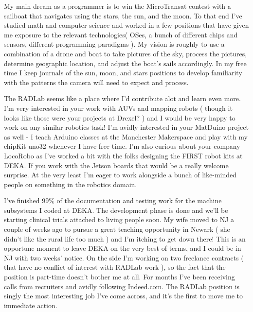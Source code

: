 \documentclass[11pt, a4paper]{awesome-cv}
\begin{document}
\makecvheader

\makelettertitle

\begin{cvletter}
My main dream as a programmer is to win the MicroTransat contest with a sailboat that navigates using the stars, the sun, and the moon. To that end I've studied math and computer science and worked in a few positions that have given me exposure to the relevant technologies( OSes, a bunch of different chips and sensors, different programming paradigms ). My vision is roughly to use a combination of a drone and boat to take pictures of the sky, process the pictures, determine geographic location, and adjust the boat's sails accordingly. In my free time I keep journals of the sun, moon, and stars positions to develop familiarity with the patterns the camera will need to expect and process. 


The RADLab seems like a place where I'd contribute alot and learn even more. I'm very interested in your work with AUVs and mapping robots ( though it looks like those were your projects at Drexel? ) and I would be very happy to work on any similar robotics task! I'm avidly interested in your MatDuino project as well - I teach Arduino classes at the Manchester Makerspace and play with my chipKit uno32 whenever I have free time. I'm also curious about your company LocoRobo as I've worked a bit with the folks designing the FIRST robot kits at DEKA. If you work with the Jetson boards that would be a really welcome surprise. At the very least I'm eager to work alongside a bunch of like-minded people on something in the robotics domain.


I've finished 99\% of the documentation and testing work for the machine subsystems I coded at DEKA. The development phase is done and we'll be starting clinical trials attached to living people soon. My wife moved to NJ a couple of weeks ago to pursue a great teaching opportunity in Newark ( she didn't like the rural life too much ) and I'm itching to get down there! This is an opportune moment to leave DEKA on the very best of terms, and I could be in NJ with two weeks' notice. On the side I'm working on two freelance contracts ( that have no conflict of interest with RADLab work ), so the fact that the position is part-time doesn't bother me at all. For months I've been receiving calls from recruiters and avidly following Indeed.com. The RADLab position is singly the most interesting job I've come across, and it's the first to move me to immediate action.

\end{cvletter}

\makeletterclosing
\end{document}
